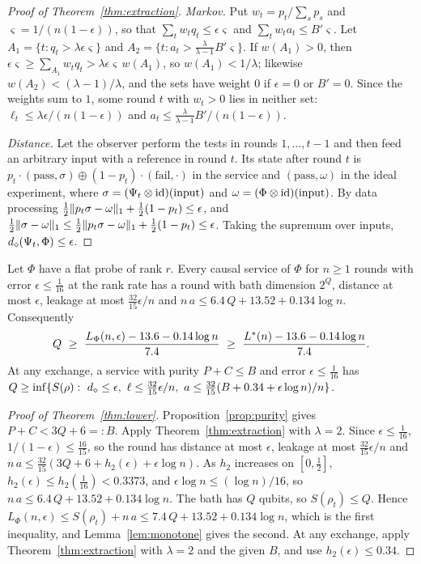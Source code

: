 \begin{proof}[Proof of Theorem~\ref{thm:extraction}]
\emph{Markov.} Put $w_t=p_t/\sum_sp_s$ and $\varsigma=1/(n(1-\epsilon))$, so that $\sum_tw_tq_t\le\epsilon\varsigma$ and $\sum_tw_ta_t\le B'\varsigma$. Let
$A_1=\{t:q_t>\lambda\epsilon\varsigma\}$ and $A_2=\{t:a_t>\frac\lambda{\lambda-1}B'\varsigma\}$. If $w(A_1)>0$, then
$\epsilon\varsigma\ge\sum_{A_1}w_tq_t>\lambda\epsilon\varsigma\,w(A_1)$, so $w(A_1)<1/\lambda$; likewise $w(A_2)<(\lambda-1)/\lambda$, and the sets have
weight $0$ if $\epsilon=0$ or $B'=0$. Since the weights sum to $1$, some round $t$ with $w_t>0$ lies in neither set:
$\ell_t\le\lambda\epsilon/(n(1-\epsilon))$ and $a_t\le\frac\lambda{\lambda-1}B'/(n(1-\epsilon))$.

\emph{Distance.} Let the observer perform the tests in rounds $1,\dots,t-1$ and then feed an arbitrary input with a reference in round $t$. Its state after
round $t$ is $p_t\cdot(\mathrm{pass},\sigma)\oplus(1-p_t)\cdot(\mathrm{fail},\cdot)$ in the service and $(\mathrm{pass},\omega)$ in the ideal experiment, where
$\sigma=(\Psi_t\otimes\mathrm{id})(\text{input})$ and $\omega=(\Phi\otimes\mathrm{id})(\text{input})$. By data processing $\frac12\lVert p_t\sigma-\omega\rVert_1+\frac12(1-p_t)\le\epsilon$,
and $\frac12\lVert \sigma-\omega\rVert_1\le\frac12\lVert p_t\sigma-\omega\rVert_1+\frac12(1-p_t)\le\epsilon$. Taking the supremum over inputs, $d_\diamond(\Psi_t,\Phi)\le\epsilon$.
\end{proof}

\begin{theorem}\label{thm:lower-constants}
Let $\Phi$ have a flat probe of rank $r$. Every causal service of $\Phi$ for $n\ge1$ rounds with error $\epsilon\le\frac1{16}$ at the rank rate has
a round with bath dimension $2^Q$, distance at most $\epsilon$, leakage at most $\frac{32}{15}\epsilon/n$ and
$n\,a\le6.4\,Q+13.52+0.134\log n$. Consequently
\[
Q\ \ge\ \frac{L_\Phi(n,\epsilon)-13.6-0.14\log n}{7.4}\ \ge\ \frac{\Ls(n)-13.6-0.14\log n}{7.4}.
\]
At any exchange, a service with purity $P+C\le B$ and error $\epsilon\le\frac1{16}$ has
$Q\ge\inf\{S(\rho):\ \ddia\le\epsilon,\ \ell\le\frac{32}{15}\epsilon/n,\ a\le\frac{32}{15}(B+0.34+\epsilon\log n)/n\}$.
\end{theorem}

\begin{proof}[Proof of Theorem~\ref{thm:lower}]
Proposition~\ref{prop:purity} gives $P+C<3Q+6=:B$. Apply Theorem~\ref{thm:extraction} with $\lambda=2$. Since $\epsilon\le\frac1{16}$,
$1/(1-\epsilon)\le\frac{16}{15}$, so the round has distance at most $\epsilon$, leakage at most $\frac{32}{15}\epsilon/n$ and
$n\,a\le\frac{32}{15}(3Q+6+h_2(\epsilon)+\epsilon\log n)$. As $h_2$ increases on $[0,\frac12]$, $h_2(\epsilon)\le h_2(\frac1{16})<0.3373$, and
$\epsilon\log n\le(\log n)/16$, so $n\,a\le6.4\,Q+13.52+0.134\log n$. The bath has $Q$ qubits, so $S(\rho_t)\le Q$. Hence
$L_\Phi(n,\epsilon)\le S(\rho_t)+n\,a\le7.4\,Q+13.52+0.134\log n$, which is the first inequality, and Lemma~\ref{lem:monotone} gives the second. At any
exchange, apply Theorem~\ref{thm:extraction} with $\lambda=2$ and the given $B$, and use $h_2(\epsilon)\le0.34$.
\end{proof}


